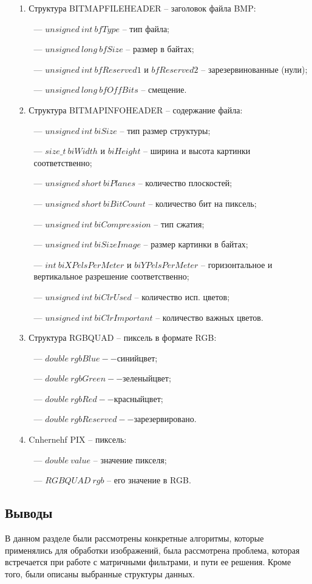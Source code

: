 \begin{enumerate}[leftmargin=1.6\parindent]
	\item[1.] Структура BITMAPFILEHEADER -- заголовок файла BMP:
	\begin{enumerate}[leftmargin=1.6\parindent]
		\item[---] $unsigned\ int\ bfType$ -- тип файла;
		\item[---] $unsigned\ long\ bfSize$ -- размер в байтах;
		\item[---] $unsigned\ int\ bfReserved1$ и $bfReserved2$ -- зарезервинованные (нули);
		\item[---] $unsigned\ long\ bfOffBits$ -- смещение.
	\end{enumerate} 
	\item[2.] Структура BITMAPINFOHEADER -- содержание файла:
	\begin{enumerate}[leftmargin=1.6\parindent]
		\item[---] $unsigned\ int\ biSize$ -- тип размер структуры;
		\item[---] $size\_t\ biWidth$ и $biHeight$ -- ширина и высота картинки соответственно;
		\item[---] $unsigned\ short\ biPlanes$ -- количество плоскостей;
		\item[---] $unsigned\ short\ biBitCount$ -- количество бит на пиксель;
		\item[---] $unsigned\ int\ biCompression$ -- тип сжатия;
		\item[---] $unsigned\ int\ biSizeImage$ -- размер картинки в байтах;
		\item[---] $int\ biXPelsPerMeter$ и $biYPelsPerMeter$ -- горизонтальное и вертикальное разрешение соответственно;
		\item[---] $unsigned\ int\ biClrUsed$ -- количество исп. цветов;
		\item[---] $unsigned\ int\ biClrImportant$ -- количество важных цветов.
	\end{enumerate} 
	\item[3.] Структура RGBQUAD -- пиксель в формате RGB:
	\begin{enumerate}[leftmargin=1.6\parindent]
		\item[---] $double\ rgbBlue -- синий цвет$;
		\item[---] $double\ rgbGreen -- зеленый цвет$;
		\item[---] $double\ rgbRed -- красный цвет$;
		\item[---] $double\ rgbReserved -- зарезервировано$.
	\end{enumerate} 
	\item[4.] Cnhernehf PIX -- пиксель:
	\begin{enumerate}[leftmargin=1.6\parindent]
		\item[---] $double\ value$ -- значение пикселя;
		\item[---] $RGBQUAD\ rgb$ -- его значение в RGB.
	\end{enumerate} 
\end{enumerate} 

\subsection*{Выводы}

В данном разделе были рассмотрены конкретные алгоритмы, которые применялись для обработки изображений, была рассмотрена проблема, которая встречается при работе с матричными фильтрами, и пути ее решения. Кроме того, были описаны выбранные структуры данных.


\pagebreak
